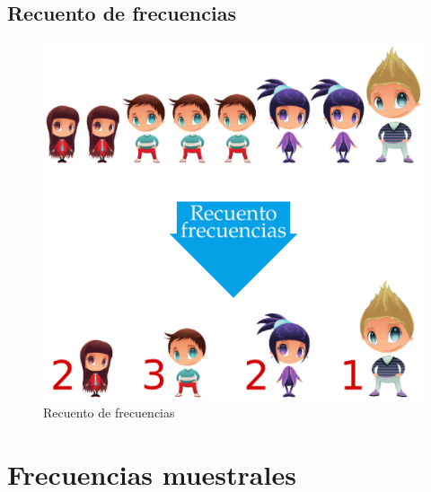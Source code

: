 \documentclass[
  a4paper,
]{scrreport}
\theoremstyle{plain}
\theoremstyle{definition}
\theoremstyle{definition}
\theoremstyle{remark}
\begin{document}
\hypertarget{recuento-de-frecuencias}{%
\subsection{Recuento de frecuencias}\label{recuento-de-frecuencias}}

\begin{figure}

{\centering \includegraphics{img/descriptiva/recuento_frecuencias.png}

}

\caption{Recuento de frecuencias}

\end{figure}

\hypertarget{frecuencias-muestrales}{%
\section{Frecuencias muestrales}\label{frecuencias-muestrales}}
\end{document}
